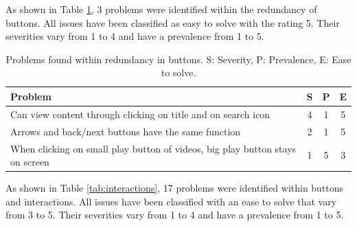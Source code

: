 \documentclass{sigchi}
\begin{document}
As shown in Table \ref{tab:redundancy}, 3 problems were identified within the redundancy of buttons. All issues have been classified as easy to solve with the rating 5. Their severities vary from 1 to 4 and have a prevalence from 1 to 5.

\begin{table}[H]
    \centering
    \begin{tabular}{|m{6.5cm}|c|c|c|}
    \hline
        \textbf{Problem} & \textbf{S} & \textbf{P} & \textbf{E}\\
    \hline
         Can view content through clicking on title and on search icon & 4 & 1 & 5\\
    \hline
         Arrows and back/next buttons have the same function & 2 & 1 & 5\\
    \hline
         When clicking on small play button of videos, big play button stays on screen & 1 & 5 & 3\\
    \hline
    \end{tabular}
    \caption{Problems found within redundancy in buttons. S: Severity, P: Prevalence, E: Ease to solve.}
    \label{tab:redundancy}
\end{table}

As shown in Table \ref{tab:interactions}, 17 problems were identified within buttons and interactions. All issues have been classified with an ease to solve that vary from 3 to 5. Their severities vary from 1 to 4 and have a prevalence from 1 to 5.
\end{document}
